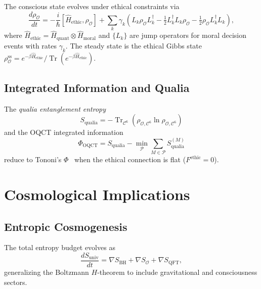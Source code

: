 \documentclass[12pt,a4paper]{article}
\theoremstyle{myrmk}
\newcommand{\Hethic}{\hat{H}_{\mathrm{ethic}}}
\newcommand{\SO}{\nabla S_{\!\mathcal{O}}}
\newcommand{\cC}{\mathcal{C}^{6}}
\newcommand{\Tr}{\operatorname{Tr}}
\begin{document}
The conscious state evolves under ethical constraints via
\begin{equation}
  \frac{d\rho_{\mathcal{O}}}{dt}
  = -\frac{i}{\hbar}[\Hethic,\rho_{\mathcal{O}}]
    + \sum_k\gamma_k\!\left(
      L_k\rho_{\mathcal{O}}L_k^\dagger
      -\tfrac{1}{2}L_k^\dagger L_k\rho_{\mathcal{O}}
      -\tfrac{1}{2}\rho_{\mathcal{O}}L_k^\dagger L_k
    \right),
  \label{eq:ethical_lindblad}
\end{equation}
where $\Hethic=\hat{H}_{\mathrm{quant}}\otimes\hat{H}_{\mathrm{moral}}$ and
$\{L_k\}$ are jump operators for moral decision events with rates $\gamma_k$.
The steady state is the ethical Gibbs state
$\rho^{\mathrm{ss}}_{\mathcal{O}}=e^{-\beta\Hethic}/\Tr(e^{-\beta\Hethic})$.

\subsection{Integrated Information and Qualia}

The \emph{qualia entanglement entropy}
\begin{equation}
  S_{\mathrm{qualia}} = -\Tr_{\cC}(\rho_{\mathcal{O},\cC}\ln\rho_{\mathcal{O},\cC})
  \label{eq:qualia_entropy}
\end{equation}
and the OQCT integrated information
\begin{equation}
  \Phi_{\mathrm{OQCT}}
  = S_{\mathrm{qualia}} - \min_{\mathcal{P}}\sum_{M\in\mathcal{P}}S_{\mathrm{qualia}}^{(M)}
  \label{eq:iit_oqct}
\end{equation}
reduce to Tononi's $\Phi$~\cite{Tononi2008} when the ethical connection is flat
($F^{\mathrm{ethic}}=0$).

\section{Cosmological Implications}
\label{sec:cosmology}

\subsection{Entropic Cosmogenesis}

The total entropy budget evolves as
\begin{equation}
  \frac{dS_{\mathrm{univ}}}{dt}
  = \nabla S_{\mathrm{BH}} + \SO + \nabla S_{\mathrm{QFT}},
  \label{eq:entropy_budget}
\end{equation}
generalizing the Boltzmann $H$-theorem to include gravitational and consciousness sectors.
\end{document}

